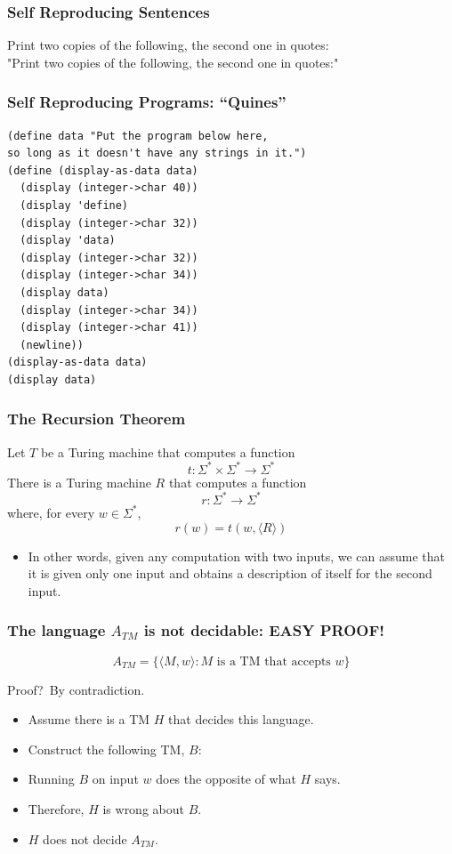 \documentclass{beamer}
\newcommand{\bfr}[1]{\begin{frame}[fragile]\frametitle{{#1}}}
\begin{document}
\bfr{Self Reproducing Sentences}

{\large
  Print two copies of the following, the second one in quotes:\\
  "Print two copies of the following, the second one in quotes:"
}
\end{frame}

\bfr{Self Reproducing Programs:  ``Quines''}
\begin{Verbatim}
(define data "Put the program below here,
so long as it doesn't have any strings in it.")
(define (display-as-data data)
  (display (integer->char 40))
  (display 'define)
  (display (integer->char 32))
  (display 'data)
  (display (integer->char 32))
  (display (integer->char 34))
  (display data)
  (display (integer->char 34))
  (display (integer->char 41))
  (newline))
(display-as-data data)
(display data)
\end{Verbatim}
\end{frame}

\bfr{The Recursion Theorem}

Let $T$ be a Turing machine that computes a function
\[
t : \Sigma^*\times \Sigma^* \rightarrow \Sigma^*
\]
There is a Turing machine $R$ that computes a function
\[
r : \Sigma^* \rightarrow \Sigma^*
\]
where, for every $w\in\Sigma^*$,
\[
r(w) = t(w, \langle R \rangle)
\]
\vfill
\pause
\begin{itemize}
\item In other words, given any computation with
  two inputs, we can assume that it is given only one input
  and obtains a description of itself for the second input.
\end{itemize}

\end{frame}

\bfr{The language $A_{TM}$ is not decidable:  EASY PROOF!}
\[
A_{TM} = \{ \langle M,w\rangle : \mbox{$M$ is a TM that accepts $w$}\}
\]

Proof?\pause\ By contradiction. 

\begin{itemize}
  \item Assume there is a TM $H$ that decides this
    language.
  \item Construct the following TM, $B$:

\centerline{
}
\item Running $B$ on input $w$ does the opposite of what $H$ says.
\item Therefore, $H$ is wrong about $B$.
\item $H$ does not decide $A_{TM}$.
\end{itemize}

\end{frame}
\end{document}
